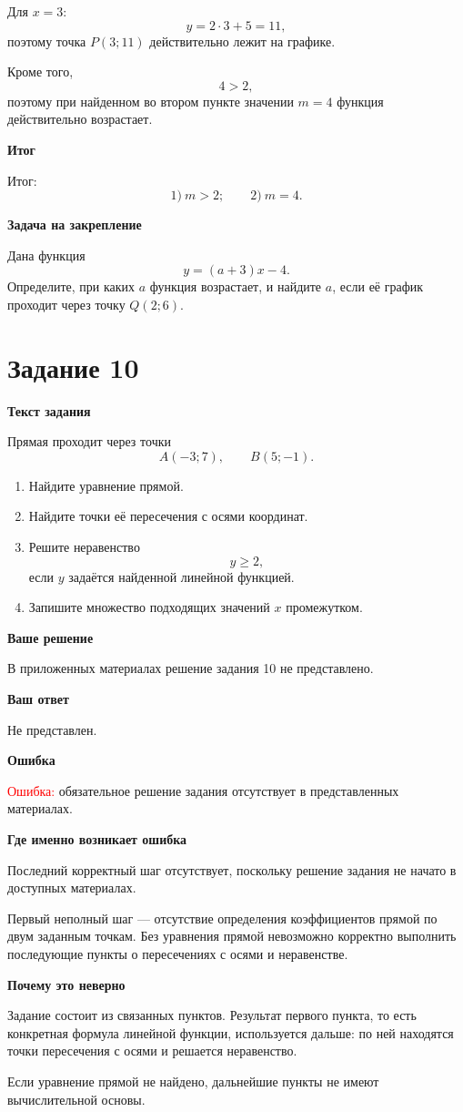 \documentclass[12pt,a4paper]{article}
\newcommand{\reviewhead}[1]{%
  \par\medskip
  \noindent\textbf{#1}\par\smallskip
}
\begin{document}
Для \(x=3\):
\[
y=2\cdot 3+5=11,
\]
поэтому точка \(P(3;11)\) действительно лежит на графике.

Кроме того,
\[
4>2,
\]
поэтому при найденном во втором пункте значении \(m=4\) функция действительно возрастает.

\reviewhead{Итог}
\textcolor{teal!60!black}{Итог:}
\[
1)\ m>2;\qquad 2)\ m=4.
\]

\reviewhead{Задача на закрепление}
Дана функция
\[
y=(a+3)x-4.
\]
Определите, при каких \(a\) функция возрастает, и найдите \(a\), если её график проходит через точку \(Q(2;6)\).

\newpage
{}\label{task:10}
\section*{Задание 10}

\reviewhead{Текст задания}
Прямая проходит через точки
\[
A(-3;7),\qquad B(5;-1).
\]
\begin{enumerate}
\item Найдите уравнение прямой.
\item Найдите точки её пересечения с осями координат.
\item Решите неравенство
\[
y\ge 2,
\]
если \(y\) задаётся найденной линейной функцией.
\item Запишите множество подходящих значений \(x\) промежутком.
\end{enumerate}

\reviewhead{Ваше решение}
В приложенных материалах решение задания 10 не представлено.

\reviewhead{Ваш ответ}
Не представлен.

\reviewhead{Ошибка}
\textcolor{red}{Ошибка:} обязательное решение задания отсутствует в представленных материалах.

\reviewhead{Где именно возникает ошибка}
Последний корректный шаг отсутствует, поскольку решение задания не начато в доступных материалах.

Первый неполный шаг --- отсутствие определения коэффициентов прямой по двум заданным точкам. Без уравнения прямой невозможно корректно выполнить последующие пункты о пересечениях с осями и неравенстве.

\reviewhead{Почему это неверно}
Задание состоит из связанных пунктов. Результат первого пункта,
то есть конкретная формула линейной функции, используется дальше:
по ней находятся точки пересечения с осями и решается неравенство.

Если уравнение прямой не найдено, дальнейшие пункты не имеют вычислительной основы.
\end{document}
